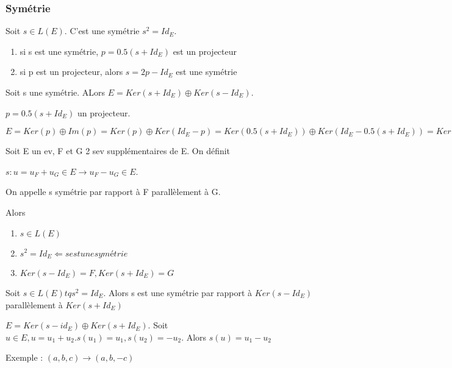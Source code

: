 \documentclass[french]{yLectureNote}
\begin{document}
\subsubsection{Symétrie}
\begin{definition}
Soit \(s\in L(E)\). C'est une symétrie \(s^2 = Id_E\).
\end{definition}
\begin{proposition}[]
\begin{enumerate}
 \item si s est une symétrie, \(p = 0.5(s+Id_E)\) est un projecteur
 \item si p est un projecteur, alors $s = 2p-Id_E$ est une symétrie
\end{enumerate}
\end{proposition}
\begin{proposition}[Corollaire]
Soit s une symétrie. ALors $E = Ker(s+Id_E)\oplus Ker(s-Id_E)$.
\end{proposition}
\begin{myproof}
 $p = 0.5(s+Id_E)$ un projecteur.

 $E = Ker(p)\oplus Im(p) = Ker(p)\oplus Ker(Id_E-p) = Ker(0.5(s+Id_E))\oplus Ker(Id_E-0.5(s+Id_E)) = Ker(s+Id_E) + Ker(s-Id_E)$
\end{myproof}
\begin{proposition}
Soit E un ev, F et G 2 sev supplémentaires de E. On définit

$s : u = u_F+u_G\in E \to u_F-u_G\in E$.

On appelle s symétrie par rapport à F parallèlement à G.

Alors \begin{enumerate}
       \item \(s\in L(E)\)
       \item \(s^2=Id_E \Leftarrow s est une symétrie\)
       \item \(Ker(s-Id_E) = F, Ker(s+Id_E) =G\)
      \end{enumerate}
\end{proposition}
\begin{myproof}

\end{myproof}
\begin{proposition}[Corollaire]
Soit \(s\in L(E) tq s^2 = Id_E\). Alors s est une symétrie par rapport à \(Ker(s-Id_E)\) parallèlement à \(Ker(s+Id_E)\)
\end{proposition}
\begin{myproof}
 $E = Ker(s-id_E)\oplus Ker(s+Id_E)$. Soit $u\in E, u = u_1+u_2. s(u_1) = u_1, s(u_2) = -u_2$. Alors $s(u) = u_1-u_2$
\end{myproof}
Exemple : $(a,b,c)\to (a,b,-c)$
\end{document}
